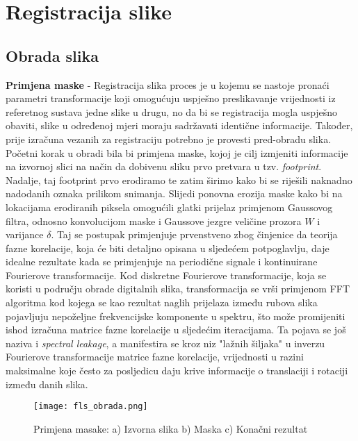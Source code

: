 \documentclass[times, utf8, diplomski]{fer}
\begin{document}
\chapter{Registracija slike}
\section{Obrada slika}
\textbf{Primjena maske} - Registracija slika proces je u kojemu se nastoje pronaći parametri transformacije koji omogućuju uspješno preslikavanje vrijednosti iz referetnog sustava jedne slike u drugu, no da bi se registracija mogla uspješno obaviti, slike u određenoj mjeri moraju sadržavati identične informacije. Također, prije izračuna vezanih za registraciju potrebno je provesti pred-obradu slika. Početni korak u obradi bila bi primjena maske, kojoj je cilj izmjeniti informacije na izvornoj slici na način da dobivenu sliku prvo pretvara u tzv. \textit{footprint}. Nadalje, taj footprint prvo erodiramo te zatim širimo kako bi se riješili naknadno nadodanih oznaka prilikom snimanja. Slijedi ponovna erozija maske kako bi na lokacijama erodiranih piksela omogućili glatki prijelaz primjenom Gaussovog filtra, odnosno konvolucijom maske i Gaussove jezgre veličine prozora $W$ i varijance $\delta$. Taj se postupak primjenjuje prvenstveno zbog činjenice da teorija fazne korelacije, koja će biti detaljno opisana u sljedećem potpoglavlju, daje idealne rezultate kada se primjenjuje na periodične signale i kontinuirane Fourierove transformacije. Kod diskretne Fourierove transformacije, koja se koristi u području obrade digitalnih slika, transformacija se vrši primjenom FFT algoritma kod kojega se kao rezultat naglih prijelaza između rubova slika pojavljuju nepoželjne frekvencijske komponente u spektru, što može promijeniti ishod izračuna matrice fazne korelacije u sljedećim iteracijama. Ta pojava se još naziva i \textit{spectral leakage}, a manifestira se kroz niz "lažnih šiljaka" u inverzu Fourierove transformacije matrice fazne korelacije, vrijednosti u razini maksimalne koje često za posljedicu daju krive informacije o translaciji i rotaciji između danih slika. 

\begin{figure}[htb]
\centering
\texttt{[image: fls\_obrada.png]}
\caption{Primjena masake: a) Izvorna slika b) Maska c) Konačni rezultat}
\label{fig:Pred-obrada slika sonara}
\end{figure}
\end{document}
